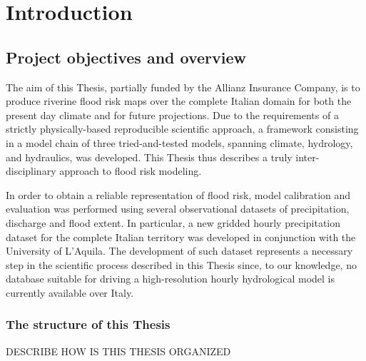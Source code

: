 \chapter{Introduction}

\section{Project objectives and overview}
The aim of this Thesis, partially funded by the Allianz Insurance Company, is to produce riverine flood risk maps over the complete Italian domain for both the present day climate and for future projections. Due to the requirements of a strictly physically-based reproducible scientific approach, a framework consisting in a model chain of three tried-and-tested models, spanning climate, hydrology, and hydraulics, was developed. This Thesis thus describes a truly inter-disciplinary approach to flood risk modeling.

In order to obtain a reliable representation of flood risk, model calibration and evaluation was performed using several observational datasets of precipitation, discharge and flood extent. In particular, a new gridded hourly precipitation dataset for the complete Italian territory was developed in conjunction with the University of L'Aquila. The development of such dataset represents a necessary step in the scientific process described in this Thesis since, to our knowledge, no database suitable for driving a high-resolution hourly hydrological model is currently available over Italy.\\

\subsection{The structure of this Thesis}
DESCRIBE HOW IS THIS THESIS ORGANIZED

